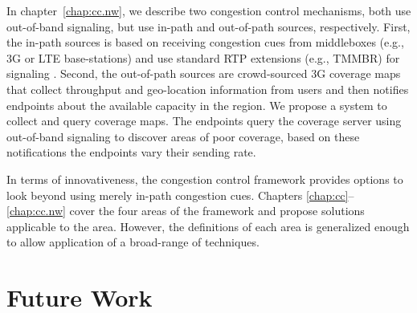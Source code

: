 In chapter~\ref{chap:cc.nw}, we describe two congestion control mechanisms,
both use out-of-band signaling, but use in-path and out-of-path sources,
respectively. First, the in-path sources is based on receiving congestion cues
from middleboxes (e.g., 3G or LTE base-stations) and use standard RTP
extensions (e.g., TMMBR) for signaling . Second, the out-of-path sources are
crowd-sourced 3G coverage maps that collect throughput and geo-location
information from users and then notifies endpoints about the available
capacity in the region. We propose a system to collect and query coverage
maps. The endpoints query the coverage server using out-of-band signaling to
discover areas of poor coverage, based on these notifications the endpoints
vary their sending rate.

In terms of innovativeness, the congestion control framework provides options
to look beyond using merely in-path congestion cues. Chapters
\ref{chap:cc}--\ref{chap:cc.nw} cover the four areas of the framework and
propose solutions applicable to the area. However, the definitions of each
area is generalized enough to allow application of a broad-range of
techniques.


\section{Future Work}